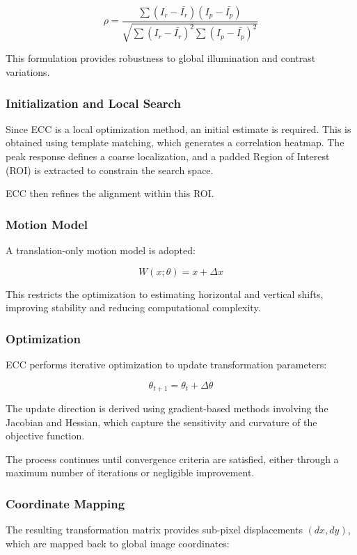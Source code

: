 \documentclass[conference]{IEEEtran}
\begin{document}
\[
\rho = \frac{\sum (I_r - \bar{I_r})(I_p - \bar{I_p})}
{\sqrt{\sum (I_r - \bar{I_r})^2 \sum (I_p - \bar{I_p})^2}}
\]

This formulation provides robustness to global illumination and contrast variations.

\subsubsection{Initialization and Local Search}

Since ECC is a local optimization method, an initial estimate is required. This is obtained using template matching, which generates a correlation heatmap. The peak response defines a coarse localization, and a padded Region of Interest (ROI) is extracted to constrain the search space.

ECC then refines the alignment within this ROI.

\subsubsection{Motion Model}

A translation-only motion model is adopted:

\[
W(x; \theta) = x + \Delta x
\]

This restricts the optimization to estimating horizontal and vertical shifts, improving stability and reducing computational complexity.

\subsubsection{Optimization}

ECC performs iterative optimization to update transformation parameters:

\[
\theta_{t+1} = \theta_t + \Delta \theta
\]

The update direction is derived using gradient-based methods involving the Jacobian and Hessian, which capture the sensitivity and curvature of the objective function.

The process continues until convergence criteria are satisfied, either through a maximum number of iterations or negligible improvement.

\subsubsection{Coordinate Mapping}

The resulting transformation matrix provides sub-pixel displacements $(dx, dy)$, which are mapped back to global image coordinates:
\end{document}
